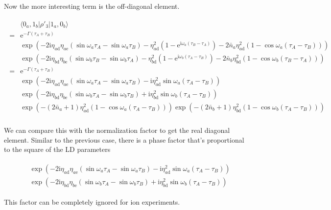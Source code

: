 \documentclass[10pt,fleqn]{article}
\newcommand{\ue}{\mathrm{e}}
\newcommand{\ui}{\mathrm{i}}
\newcommand{\eqar}[1]
{
  \begin{align}
    #1
  \end{align}
}
\newcommand{\paren}[1]{{\left({#1}\right)}}
\begin{document}
Now the more interesting term is the off-diagonal element.
\eqar{
  \begin{split}
    &\langle0_a,1_b|\rho'_3|1_a,0_b\rangle\\
    =&\ue^{-\Gamma\paren{\tau_A+\tau_B}}\\
    &\exp\paren{
      -2\ui\eta_{a\mathrm{d}}
      \eta_{a\mathrm{e}}\paren{\sin\omega_a\tau_{A}-\sin\omega_a\tau_{B}}
      -\eta_{a\mathrm{d}}^2\paren{1-\ue^{\ui\omega_a\paren{\tau_{B}-\tau_{A}}}}
      -2{\bar n_a}\eta_{a\mathrm{d}}^2\paren{1-\cos\omega_a\paren{\tau_{A}-\tau_{B}}}
      }\\
    &\exp\paren{
      -2\ui\eta_{b\mathrm{d}}
      \eta_{b\mathrm{e}}\paren{\sin\omega_b\tau_{B}-\sin\omega_b\tau_{A}}
      -\eta_{b\mathrm{d}}^2\paren{1-\ue^{\ui\omega_b\paren{\tau_{A}-\tau_{B}}}}
      -2{\bar n_b}\eta_{b\mathrm{d}}^2\paren{1-\cos\omega_b\paren{\tau_{B}-\tau_{A}}}
      }\\
    =&\ue^{-\Gamma\paren{\tau_A+\tau_B}}\\
    &\exp\paren{
      -2\ui\eta_{a\mathrm{d}}\eta_{a\mathrm{e}}
      \paren{\sin\omega_a\tau_{A}-\sin\omega_a\tau_{B}}
      -\ui\eta_{a\mathrm{d}}^2\sin\omega_a\paren{\tau_{A}-\tau_{B}}
      }\\
    &\exp\paren{
      -2\ui\eta_{b\mathrm{d}}\eta_{b\mathrm{e}}
      \paren{\sin\omega_b\tau_{A}-\sin\omega_b\tau_{B}}
      +\ui\eta_{b\mathrm{d}}^2\sin\omega_b\paren{\tau_{A}-\tau_{B}}
      }\\
    &\exp\paren{
      -\paren{2{\bar n_a}+1}\eta_{a\mathrm{d}}^2\paren{1-\cos\omega_a\paren{\tau_{A}-\tau_{B}}}
      }
      \exp\paren{
      -\paren{2{\bar n_b}+1}\eta_{b\mathrm{d}}^2\paren{1-\cos\omega_b\paren{\tau_{A}-\tau_{B}}}
      }\\
  \end{split}
}
We can compare this with the normalization factor to get the real diagonal element.
Similar to the previous case, there is a phase factor that's proportional
to the square of the LD parameters
\eqar{
  \begin{split}
    &\exp\paren{
      -2\ui\eta_{a\mathrm{d}}\eta_{a\mathrm{e}}
      \paren{\sin\omega_a\tau_{A}-\sin\omega_a\tau_{B}}
      -\ui\eta_{a\mathrm{d}}^2\sin\omega_a\paren{\tau_{A}-\tau_{B}}
      }\\
    &\exp\paren{
      -2\ui\eta_{b\mathrm{d}}\eta_{b\mathrm{e}}
      \paren{\sin\omega_b\tau_{A}-\sin\omega_b\tau_{B}}
      +\ui\eta_{b\mathrm{d}}^2\sin\omega_b\paren{\tau_{A}-\tau_{B}}
      }
  \end{split}
}
This factor can be completely ignored for ion experiments.\\
\end{document}
